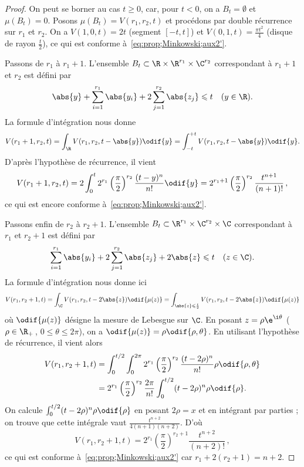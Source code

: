 \documentclass[11pt, useosf,
  title in boldface,
  theorem in new line,
  theorem numbering = section,
  number theorems separately,
]{simplivre}
\begin{document}
    \begin{proof}
        On peut se borner au cas \( t \geqslant 0 \), car, pour \( t < 0 \), on a \( B_t = \emptyset \) et \( \mu(B_t) = 0 \). Posons \( \mu(B_t) = V(r_1, r_2, t) \) et procédons par double récurrence sur \( r_1 \) et \( r_2 \). On a \( V(1,0,t) = 2t \) (segment \( [-t,t] \)) et \( V(0,1,t) = \frac{\pi t^2}{4} \) (disque de rayon \( \frac{t}{2} \)), ce qui est conforme à~\eqref{eq:prop;Minkowski;aux2'}.

        Passons de \( r_1 \) à \( r_1 + 1 \). L'ensemble \( B_t \subset \R \times \R^{r_1} \times \C^{r_2} \) correspondant à \( r_1 + 1 \) et \( r_2 \) est défini par
        \[
            \abs{y} + \sum_{i=1}^{r_1} \abs{y_i} + 2 \sum_{j=1}^{r_2} \abs{z_j} \leqslant t \quad \text{(\( y \in \R \))}.
        \]
        La formule d'intégration  nous donne
        \[
            V(r_1+1,r_2,t) = \int_{\R} V(r_1,r_2,t-\abs{y}) \odif{y} = \int_{-t}^{+t} V(r_1,r_2,t-\abs{y}) \odif{y}.
        \]
        D'après l'hypothèse de récurrence, il vient
        \[
            V(r_1+1,r_2,t) = 2 \int_0^t 2^{r_1} \left(\frac{\pi}{2}\right)^{r_2} \frac{(t-y)^n}{n!} \odif{y} = 2^{r_1+1} \left(\frac{\pi}{2}\right)^{r_2} \frac{t^{n+1}}{(n+1)!}\,,
        \]
        ce qui est encore conforme à~\eqref{eq:prop;Minkowski;aux2'}.

        Passons enfin de \( r_2 \) à \( r_2+1 \). L'ensemble \( B_t \subset \R^{r_1} \times \C^{r_2} \times \C \) correspondant à \( r_1 \) et \( r_2 + 1 \) est défini par
        \[
            \sum_{i=1}^{r_1} \abs{y_i} + 2 \sum_{j=1}^{r_2} \abs{z_j} + 2\abs{z} \leqslant t \quad \text{(\( z \in \C \))}.
        \]
        La formule d'intégration  nous donne ici
        \[
            V(r_1,r_2+1,t) = \int_{\C} V(r_1,r_2,t-2\abs{z}) \odif{\mu(z)} = \int_{\abs{z}\leqslant\frac{t}{2}} V(r_1,r_2,t-2\abs{z}) \odif{\mu(z)}
        \]
        où \( \odif{\mu(z)} \) désigne la mesure de Lebesgue sur \( \C \). En posant \( z = \rho \e^{\i\theta} \) (\( \rho \in \R_{+} \)\,, \( 0 \leqslant \theta \leqslant 2\pi \)), on a \( \odif{\mu(z)} = \rho \odif{\rho,\theta} \). En utilisant l'hypothèse de récurrence, il vient alors
        \begin{align*}
            V(r_1,r_2+1,t) &= \int_0^{t/2} \int_0^{2\pi} 2^{r_1} \left(\frac{\pi}{2}\right)^{r_2} \frac{(t-2\rho)^n}{n!} \rho \odif{\rho,\theta}\\
            &= 2^{r_1} \left(\frac{\pi}{2}\right)^{r_2} \frac{2\pi}{n!} \int_0^{t/2} (t-2\rho)^n \rho \odif{\rho}.
        \end{align*}
        On calcule \( \int_0^{t/2} (t-2\rho)^n \rho \odif{\rho} \) en posant \( 2\rho = x \) et en intégrant par parties ; on trouve que cette intégrale vaut \( \frac{t^{n+2}}{4(n+1)(n+2)} \). D'où
        \[
            V(r_1,r_2+1,t) = 2^{r_1} \left(\frac{\pi}{2}\right)^{r_2+1} \frac{t^{n+2}}{(n+2)!} \,,
        \]
        ce qui est conforme à~\eqref{eq:prop;Minkowski;aux2'} car \( r_1 + 2(r_2+1) = n+2 \).
    \end{proof}
\end{document}
